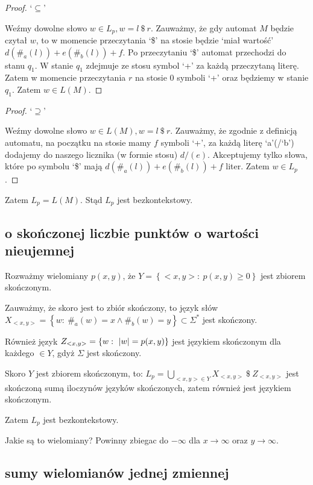\documentclass{article}
\theoremstyle{definition}
\theoremstyle{remark}
\begin{document}
\begin{proof}
    `\(\subseteq\)'

    Weźmy dowolne słowo \(w \in L_p, w = l \ \$ \ r\).
    Zauważmy, że gdy automat \(M\) będzie czytał \(w\),
    to w momencie przeczytania `\$' na stosie będzie `miał wartość' \(d(\#_{a}(l))+e(\#_{b}(l))+f\).
    Po przeczytaniu `\$' automat przechodzi do stanu \(q_1\).
    W stanie \(q_1\) zdejmuje ze stosu symbol `+' za każdą przeczytaną literę.
    Zatem w momencie przeczytania \(r\) na stosie 0 symboli `+' oraz będziemy w stanie \(q_1\).
    Zatem \(w \in L(M)\).
\end{proof}
\begin{proof}
    `\(\supseteq\)'

    Weźmy dowolne słowo \(w \in L(M), w = l \ \$ \ r\).
    Zauważmy, że zgodnie z definicją automatu,
    na początku na stosie mamy \(f\) symboli `+',
    za każdą literę `a'(/`b') dodajemy do naszego licznika (w formie stosu) \(d/(e)\).
    Akceptujemy tylko słowa, które po symbolu `\$' mają \(d(\#_{a}(l))+e(\#_{b}(l))+f\) liter.
    Zatem \(w \in L_p\).
\end{proof}

Zatem \(L_p = L(M)\).
Stąd \(L_p\) jest bezkontekstowy.

\subsection{o skończonej liczbie punktów o wartości nieujemnej}

Rozważmy wielomiany \(p(x,y)\), że \( Y = \left\{ <x,y>: \ p(x,y) \geq 0 \right\}\) jest zbiorem skończonym.

Zauważmy, że skoro jest to zbiór skończony, to język słów \( X_{<x,y>} = \left\{ w: \ \#_a(w) = x \land \#_b(w) = y \right\} \subset \Sigma^* \) jest skończony.

Również język \(Z_{<x,y>} = \left\{ w: \ \abs{w} = p(x,y) \right\}\) jest językiem skończonym dla każdego \(<x,y> \in Y\), gdyż \(\Sigma\) jest skończony.

Skoro \(Y\) jest zbiorem skończonym, to: 
\(L_p = \bigcup_{<x,y> \in Y} {X_{<x,y>}\ \$ \ Z_{<x,y>}} \) jest skończoną sumą iloczynów języków skończonych, zatem również jest językiem skończonym.

Zatem \(L_p\) jest bezkontekstowy.

Jakie są to wielomiany?
Powinny zbiegac do \(- \infty\) dla \(x \to \infty\) oraz \(y \to \infty\).

\subsection{sumy wielomianów jednej zmiennej}
\end{document}
